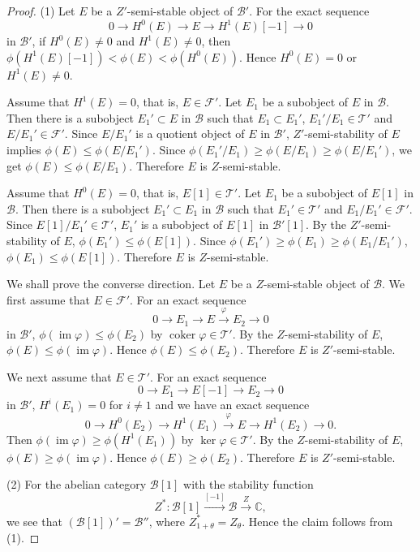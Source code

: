 \documentclass[leqno,11pt]{amsart}
\def\C{\ensuremath{\mathbb{C}}}
\def\im{\mathop{\mathrm{im}}\nolimits}
\def\coker{\mathop{\mathrm{coker}}\nolimits}
\theoremstyle{definition}
\def\C{\ensuremath{\mathbb{C}}}
\def\BB{\ensuremath{\mathcal B}}
\def\FF{\ensuremath{\mathcal F}}
\def\TT{\ensuremath{\mathcal T}}
\begin{document}
\begin{proof}
(1)
Let $E$ be a $Z'$-semi-stable object of $\BB'$.
For the exact sequence
\begin{equation}
0 \to H^0(E) \to E \to H^1(E)[-1] \to 0
\end{equation}
in $\BB'$,
if $H^0(E) \ne 0$ and $H^1(E) \ne 0$, then 
$\phi(H^1(E)[-1])<\phi(E)<\phi(H^0(E))$.
Hence $H^0(E)=0$ or $H^1(E) \ne 0$.

Assume that $H^1(E)=0$, that is, $E \in \FF'$.
Let $E_1$ be a subobject of $E$ in $\BB$.
Then there is a subobject $E_1' \subset E$ in $\BB$ such that
$E_1 \subset E_1'$, $E_1'/E_1 \in \TT'$ and $E/E_1' \in \FF'$.
Since $E/E_1'$ is a quotient object of $E$ in $\BB'$,
$Z'$-semi-stability of $E$ implies 
$\phi(E) \leq \phi(E/E_1')$.
Since $\phi(E_1'/E_1) \geq \phi(E/E_1) \geq \phi(E/E_1')$,
we get $\phi(E) \leq \phi(E/E_1)$.
Therefore $E$ is $Z$-semi-stable.

Assume that $H^0(E)=0$, that is, $E[1] \in \TT'$.
Let $E_1$ be a subobject of $E[1]$ in $\BB$.
Then there is a subobject $E_1' \subset E_1$ in $\BB$ such that
$E_1' \in \TT'$ and $E_1/E_1' \in \FF'$.
Since $E[1]/E_1' \in \TT'$,
$E_1'$ is a subobject of $E[1]$ in $\BB'[1]$.
By the $Z'$-semi-stability of $E$, 
$\phi(E_1') \leq \phi(E[1])$.
Since $\phi(E_1') \geq \phi(E_1) \geq \phi(E_1/E_1')$,
$\phi(E_1) \leq \phi(E[1])$.
Therefore $E$ is $Z$-semi-stable.

We shall prove the converse direction.
Let $E$ be a $Z$-semi-stable object of $\BB$.
We first assume that $E \in \FF'$.
For an exact sequence
\begin{equation}
0 \to E_1 \to E \overset{\varphi}{\to} E_2 \to 0
\end{equation}
in $\BB'$,
$\phi(\im \varphi) \leq \phi(E_2)$ by
$\coker \varphi \in \TT'$.
By the $Z$-semi-stability of $E$,
$\phi(E) \leq \phi(\im \varphi)$.
Hence $\phi(E) \leq \phi(E_2)$.
Therefore $E$ is $Z'$-semi-stable.

We next assume that $E \in \TT'$.
For an exact sequence
\begin{equation}
0 \to E_1 \to E[-1] \to E_2 \to 0
\end{equation}
in $\BB'$,
$H^i(E_1)=0$ for $i \ne 1$ and
we have an exact sequence
\begin{equation}
0 \to H^0(E_2) \to H^1(E_1) \overset{\varphi}{\to} E \to H^1(E_2) \to 0.
\end{equation}
Then 
$\phi(\im \varphi) \geq \phi(H^1(E_1))$ by
$\ker \varphi \in \TT'$.
By the $Z$-semi-stability of $E$,
$\phi(E) \geq \phi(\im \varphi)$.
Hence $\phi(E) \geq \phi(E_2)$.
Therefore $E$ is $Z'$-semi-stable.

(2)
For the abelian category $\BB[1]$ with 
the stability function 
$$
Z^*:\BB[1] \overset{[-1]}{\to} \BB \overset{Z}{\to}\C,
$$  
we see that
$(\BB[1])'=\BB''$, where $Z_{1+\theta}^*=Z_\theta$.
Hence the claim follows from (1).
\end{proof}
\end{document}
